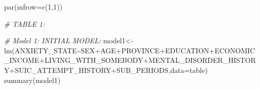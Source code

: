 \documentclass[
]{book}
\newenvironment{Shaded}{\begin{snugshade}}{\end{snugshade}}
\newcommand{\AttributeTok}[1]{\textcolor[rgb]{0.77,0.63,0.00}{#1}}
\newcommand{\CommentTok}[1]{\textcolor[rgb]{0.56,0.35,0.01}{\textit{#1}}}
\newcommand{\DecValTok}[1]{\textcolor[rgb]{0.00,0.00,0.81}{#1}}
\newcommand{\FunctionTok}[1]{\textcolor[rgb]{0.00,0.00,0.00}{#1}}
\newcommand{\NormalTok}[1]{#1}
\newcommand{\OtherTok}[1]{\textcolor[rgb]{0.56,0.35,0.01}{#1}}
\newcommand{\SpecialCharTok}[1]{\textcolor[rgb]{0.00,0.00,0.00}{#1}}
\begin{document}
\begin{Shaded}
\begin{Highlighting}[]
\FunctionTok{par}\NormalTok{(}\AttributeTok{mfrow=}\FunctionTok{c}\NormalTok{(}\DecValTok{1}\NormalTok{,}\DecValTok{1}\NormalTok{))}


\CommentTok{\# TABLE 1:}

\CommentTok{\# Model 1: INITIAL MODEL:}
\NormalTok{model1}\OtherTok{\textless{}{-}}\FunctionTok{lm}\NormalTok{(ANXIETY\_STATE}\SpecialCharTok{\textasciitilde{}}\NormalTok{SEX}\SpecialCharTok{+}\NormalTok{AGE}\SpecialCharTok{+}\NormalTok{PROVINCE}\SpecialCharTok{+}\NormalTok{EDUCATION}\SpecialCharTok{+}\NormalTok{ECONOMIC\_INCOME}\SpecialCharTok{+}\NormalTok{LIVING\_WITH\_SOMEBODY}\SpecialCharTok{+}\NormalTok{MENTAL\_DISORDER\_HISTORY}\SpecialCharTok{+}\NormalTok{SUIC\_ATTEMPT\_HISTORY}\SpecialCharTok{+}\NormalTok{SUB\_PERIODS,}\AttributeTok{data=}\NormalTok{table)}
\FunctionTok{summary}\NormalTok{(model1)}
\end{Highlighting}
\end{Shaded}
\end{document}
